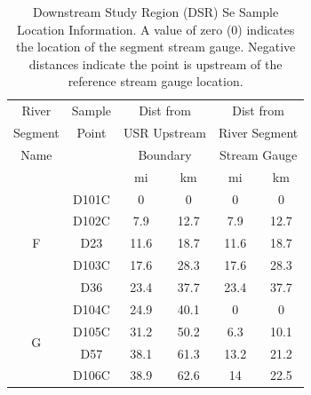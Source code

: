 \begin{table}[htbp]
	\centering
	\caption[Downstream Study Region (DSR) Se Sample Location Information.]{Downstream Study Region (DSR) Se Sample Location Information.  A value of zero (0) indicates the location of the segment stream gauge.  Negative distances indicate the point is upstream of the reference stream gauge location.}
	\label{tab:DSRSampleLoc}
	\begin{tabular}{cccccc}
		\toprule
		River                        & Sample &  \multicolumn{2}{c}{Dist from}   &   \multicolumn{2}{c}{Dist from}   \\
		Segment                       & Point  & \multicolumn{2}{c}{USR Upstream} & \multicolumn{2}{c}{River Segment} \\
		Name                         &        &   \multicolumn{2}{c}{Boundary}   & \multicolumn{2}{c}{Stream Gauge}  \\
		\cmidrule(r{0.5em}l){3-4} \cmidrule(r{0.5em}l){5-6} &        &  mi  &            km             &  mi  &             km             \\ \toprule
		\multirow{5}{*}{F}                  & D101C  &  0   &             0             &  0   &             0              \\
		& D102C  & 7.9  &           12.7            & 7.9  &            12.7            \\
		&  D23   & 11.6 &           18.7            & 11.6 &            18.7            \\
		& D103C  & 17.6 &           28.3            & 17.6 &            28.3            \\
		&  D36   & 23.4 &           37.7            & 23.4 &            37.7            \\ \midrule
		\multirow{4}{*}{G}                  & D104C  & 24.9 &           40.1            &  0   &             0              \\
		& D105C  & 31.2 &           50.2            & 6.3  &            10.1            \\
		&  D57   & 38.1 &           61.3            & 13.2 &            21.2            \\
		& D106C  & 38.9 &           62.6            &  14  &            22.5            \\ \bottomrule
	\end{tabular}
\end{table}

